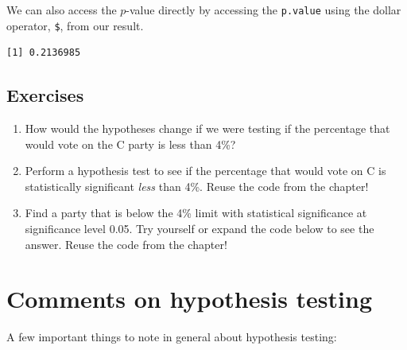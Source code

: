 \documentclass[
  letterpaper,
  DIV=11,
  numbers=noendperiod]{scrreprt}
\newenvironment{Shaded}{\begin{snugshade}}{\end{snugshade}}
\newcommand{\NormalTok}[1]{\textcolor[rgb]{0.00,0.23,0.31}{#1}}
\newcommand{\SpecialCharTok}[1]{\textcolor[rgb]{0.37,0.37,0.37}{#1}}
\providecommand{\tightlist}{%
  \setlength{\itemsep}{0pt}\setlength{\parskip}{0pt}}\usepackage{longtable,booktabs,array}
\begin{document}
We can also access the \(p\)-value directly by accessing the
\texttt{p.value} using the dollar operator, \texttt{\$}, from our
result.

\begin{Shaded}
\end{Shaded}

\begin{verbatim}
[1] 0.2136985
\end{verbatim}

\subsection{Exercises}\label{exercises-9}

\begin{enumerate}
\def\labelenumi{\arabic{enumi}.}
\tightlist
\item
  How would the hypotheses change if we were testing if the percentage
  that would vote on the C party is less than 4\%?
\item
  Perform a hypothesis test to see if the percentage that would vote on
  C is statistically significant \emph{less} than 4\%. Reuse the code
  from the chapter!
\item
  Find a party that is below the 4\% limit with statistical significance
  at significance level 0.05. Try yourself or expand the code below to
  see the answer. Reuse the code from the chapter!
\end{enumerate}

\section{Comments on hypothesis
testing}\label{comments-on-hypothesis-testing}

A few important things to note in general about hypothesis testing:
\end{document}
